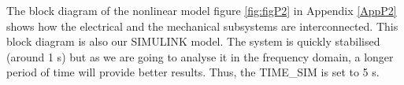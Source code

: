 The block diagram of the nonlinear model figure \ref{fig:figP2} in Appendix \ref{AppP2} shows how the electrical and the mechanical subsystems are interconnected. This block diagram is also our SIMULINK model. The system is quickly stabilised (around 1 s) but as we are going to analyse it in the frequency domain, a longer period of time will provide better results. Thus, the TIME\_SIM is set to 5 s. 
